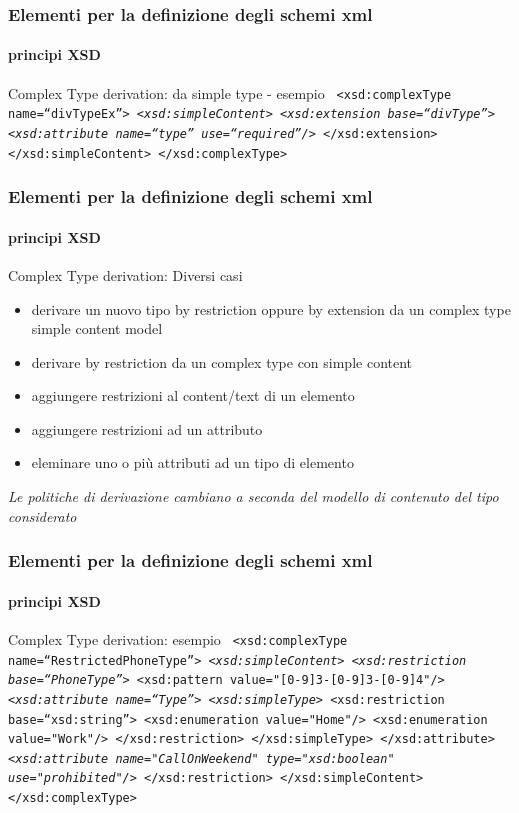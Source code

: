 \begin{frame}
	\frametitle{Elementi per la definizione degli schemi xml}
	\framesubtitle{principi XSD}
	\addtocounter{nframe}{1}

	\begin{block}{Complex Type derivation: da simple type - esempio}
		\texttt{
			<xsd:complexType name=``divTypeEx''>
			\emph{<xsd:simpleContent>}
			\emph{<xsd:extension base=``divType''>}
			\emph{<xsd:attribute name=``type'' use=``required''/>}
			</xsd:extension>
			</xsd:simpleContent>
			</xsd:complexType>
		}
	\end{block}
\end{frame}

\begin{frame}
	\frametitle{Elementi per la definizione degli schemi xml}
	\framesubtitle{principi XSD}
	\addtocounter{nframe}{1}

	\begin{block}{Complex Type derivation: Diversi casi}
		\begin{itemize}
			\item derivare un nuovo tipo by restriction oppure by extension da un complex type simple content model
			\item derivare by restriction da un complex type con simple content
			\item aggiungere restrizioni al content/text di un elemento
			\item aggiungere restrizioni ad un attributo
			\item eleminare uno o più attributi ad un tipo di elemento
		\end{itemize}
	\end{block}
	\textit{Le politiche di derivazione cambiano a seconda del modello di contenuto del tipo considerato}

\end{frame}

\begin{frame}
	\frametitle{Elementi per la definizione degli schemi xml}
	\framesubtitle{principi XSD}
	\addtocounter{nframe}{1}

	\begin{block}{Complex Type derivation: esempio}
		\texttt{
		<xsd:complexType name=``RestrictedPhoneType''>
		\emph{<xsd:simpleContent>}
		\emph{<xsd:restriction base=``PhoneType''>}
		<xsd:pattern value="[0-9]{3}-[0-9]{3}-[0-9]{4}"/>
		\emph{<xsd:attribute name=``Type''>}
		\emph{<xsd:simpleType>}
		<xsd:restriction base=``xsd:string''>
		<xsd:enumeration value="Home"/>
		<xsd:enumeration value="Work"/>
		</xsd:restriction>
		</xsd:simpleType>
		</xsd:attribute>
		\emph{<xsd:attribute name="CallOnWeekend" type="xsd:boolean" use="prohibited"/> }
		</xsd:restriction>
		</xsd:simpleContent>
		</xsd:complexType>
		}
	\end{block}
\end{frame}


